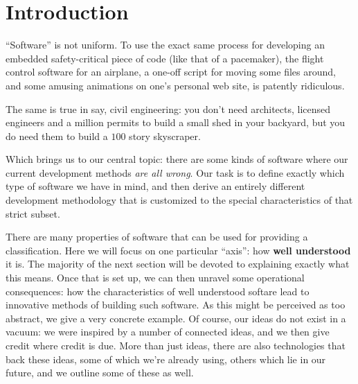 \documentclass[sigconf,review]{acmart}
\begin{document}


\newtheorem{defn}{Definition}

\maketitle

\section{Introduction} \label{ch:introduction}

``Software'' is not uniform. To use the exact same process for
developing an embedded safety-critical piece of code (like that of
a pacemaker), the flight control software for an airplane, a one-off
script for moving some files around, and some amusing animations on
one's personal web site, is patently ridiculous.

The same is true in say, civil engineering: you don't need architects,
licensed engineers and a million permits to build a small shed in your
backyard, but you do need them to build a $100$ story skyscraper.

Which brings us to our central topic: there are some kinds of software
where our current development methods \emph{are all wrong}. Our task
is to define exactly which type of software we have in mind, and then
derive an entirely different development methodology that is
customized to the special characteristics of that strict subset.

There are many properties of software that can be used for providing
a classification. Here we will focus on one particular ``axis'': how
\textbf{well understood} it is. The majority of the next section will
be devoted to explaining exactly what this means. Once that is set up,
we can then unravel some operational consequences: how the characteristics of
well understood softare lead to innovative methods of building such
software. As this might be perceived as too abstract, we give a very
concrete example. Of course, our ideas do not exist in a vacuum: we were
inspired by a number of connected ideas, and we then give credit where
credit is due. More than just ideas, there are also technologies that back
these ideas, some of which we're already using, others which lie in our
future, and we outline some of these as well. %
\end{document}
